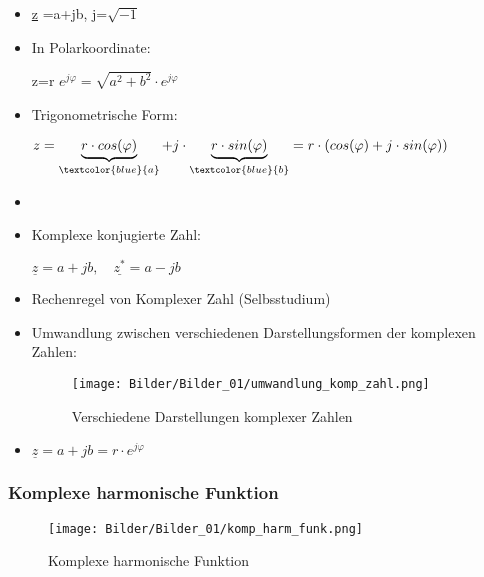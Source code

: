 \begin{itemize}[topsep=2pt]
    \item 
    \underline{z} =a+jb, \quad j=$\sqrt{-1}$
    \item
    In Polarkoordinate:\par
    z=r \cdot $e^{j\varphi}=\sqrt{a^{2}+b^{2}} \cdot e^{j\varphi}$
    \item
    Trigonometrische Form:\par
    $z=\underbrace{r \cdot cos(\varphi)}_{\textcolor{blue}{a}}+j \cdot \underbrace{r \cdot sin(\varphi)}_{\textcolor{blue}{b}}=r \cdot (cos(\varphi)+j \cdot sin(\varphi))$
    \item[]
    \item
    Komplexe konjugierte Zahl:\par
    $\underline{z}=a+jb, \quad \underline{z^{*}}=a-jb$
    \item
    Rechenregel von Komplexer Zahl (Selbsstudium)
    \item
    Umwandlung zwischen verschiedenen Darstellungsformen der komplexen Zahlen:\par
    \begin{figure}[H]
        \centering
        \texttt{[image: Bilder/Bilder\_01/umwandlung\_komp\_zahl.png]}
        \caption{Verschiedene Darstellungen komplexer Zahlen}
        \label{fig:Verschiedene Darstellungen komplexer Zahlen}
    \end{figure}
    \item[]
    \centerline{$\underline{z}=a+jb=r \cdot e^{j\varphi}$}
\end{itemize}


\subsubsection{\textbf{Komplexe harmonische Funktion}}
\begin{figure}[H]
    \centering
    \texttt{[image: Bilder/Bilder\_01/komp\_harm\_funk.png]}
    \caption{Komplexe harmonische Funktion}
    \label{fig:Komplexe harmonische Funktion}
\end{figure}

